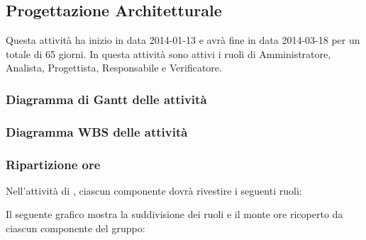 \subsection{Progettazione Architetturale}
Questa attività ha inizio in data 2014-01-13 e avrà fine in data 2014-03-18 per un totale di 65 giorni. In questa attività sono attivi i ruoli di Amministratore, Analista, Progettista, Responsabile e Verificatore.

\subsubsection{Diagramma di Gantt delle attività}

\newpage
\subsubsection{Diagramma WBS delle attività}

\newpage
\subsubsection{Ripartizione ore}

\newpage
Nell'attività di , ciascun componente dovrà rivestire i seguenti ruoli:

Il seguente grafico mostra la suddivisione dei ruoli e il monte ore ricoperto da ciascun componente del gruppo:
